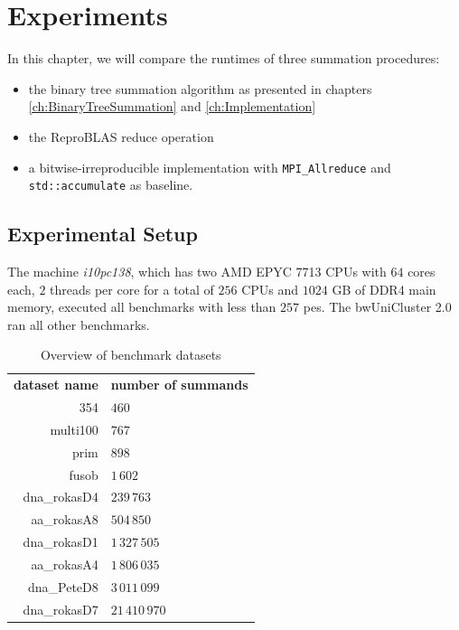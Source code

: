\chapter{Experiments}
\label{ch:Experiments}

In this chapter, we will compare the runtimes of three summation procedures:
\begin{itemize}
  \item the binary tree summation algorithm as presented in chapters \ref{ch:BinaryTreeSummation} and \ref{ch:Implementation}
  \item the ReproBLAS reduce operation
  \item a bitwise-irreproducible implementation with \texttt{MPI\_Allreduce} and \texttt{std::accumulate} as baseline.
\end{itemize}

\section{Experimental Setup}
\label{sec:ExperimentalSetup}
The machine \textit{i10pc138}, which has two AMD EPYC 7713 CPUs with $64$ cores each, $2$ threads per core for a total of $256$ CPUs and $1024$ GB of DDR4 main memory, executed all benchmarks with less than $257$ \glspl{pe}.
The bwUniCluster 2.0 ran all other benchmarks.

\begin{table}
\centering
\begin{tabular}{r|l}
\textbf{dataset name} & \textbf{number of summands} \\
354 & $460$ \\
multi100 & $767$ \\
prim & $898$ \\
fusob & $1\,602$ \\
dna\_rokasD4 & $239\,763$ \\
aa\_rokasA8 & $504\,850$ \\
dna\_rokasD1 & $1\,327\,505$ \\
aa\_rokasA4 & $1\,806\,035$ \\
dna\_PeteD8 & $3\,011\,099$ \\
dna\_rokasD7 & $21\,410\,970$ \\
\end{tabular}
\caption{Overview of benchmark datasets}
\label{table:datasets}
\end{table}

